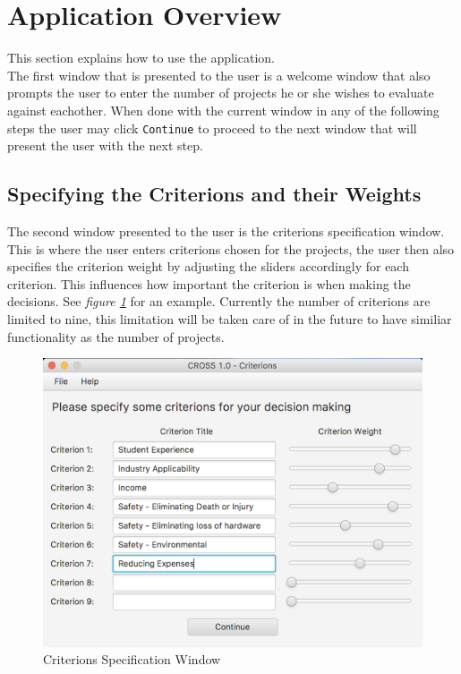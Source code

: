 \documentclass[11pt]{article}
\newcommand{\code}[1]{\texttt{#1}}
\begin{document}
	\section{Application Overview}
		This section explains how to use the application.\\

		The first window that is presented to the user is a welcome window that also prompts the user to enter the number of projects he or she wishes to evaluate against eachother. When done with the current window in any of the following steps the user may click \code{Continue} to proceed to the next window that will present the user with the next step.

		\subsection{Specifying the Criterions and their Weights}
			The second window presented to the user is the criterions specification window. This is where the user enters criterions chosen for the projects, the user then also specifies the criterion weight by adjusting the sliders accordingly for each criterion. This influences how important the criterion is when making the decisions. See \textit{figure \ref{fig:criterions}} for an example. Currently the number of criterions are limited to nine, this limitation will be taken care of in the future to have similiar functionality as the number of projects.

			\begin{figure}[!htb]
				\centering
				\includegraphics[scale=0.55]{criterions}
				\caption{Criterions Specification Window} %
				\label{fig:criterions} %
			\end{figure}
\end{document}
